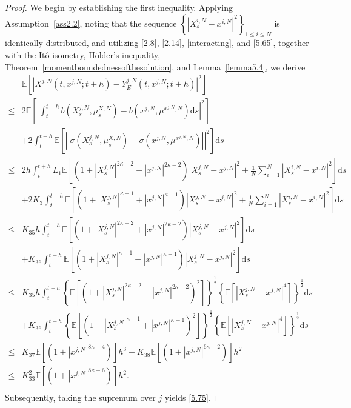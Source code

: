 \documentclass[12pt]{article}
\numberwithin{equation}{section}
\begin{document}
\begin{proof}  We begin by establishing the first inequality. Applying Assumption~\ref{ass2.2}, noting that the sequence $\left\{ \left|X_s^{i,N} - x^{i,N}\right|^2 \right\}_{1 \leq i \leq N}$ is identically distributed, and utilizing  \eqref{2.8}, \eqref{2.14}, \eqref{interacting}, and \eqref{5.65}, together with the It\^o isometry, H\"older's inequality, Theorem~\ref{momentboundednessofthesolution}, and Lemma~\ref{lemma5.4}, we derive 
\begin{equation}\tag{5.105}\label{5.78}
\begin{aligned}
& \mathbb{E}\left[\left|X^{j,N}\left(t, x^{j,N} ; t+h\right)-Y^{j,N}_E\left(t, x^{j,N} ; t+h\right)\right|^{2}\right] \\
\leq & 2\mathbb{E}\left[\left|\int_t^{t+h} b\left({X}^{j,N}_s,\mu^{X,N}_s\right)-b\left( x^{j,N},\mu ^{x^{j,N},N} \right) \mathrm{d} s\right|^{2}\right]\\
&+2\int_t^{t+h} \mathbb{E}\left[\left|\left|\sigma\left({X}^{j,N}_s,\mu^{X,N}_s\right)-\sigma\left( x^{j,N},\mu ^{x^{j,N},N} \right) \right|\right|^{2}\right]\mathrm{d}s \\
\leq & 2 h\int_t^{t+h} L_1 \mathbb{E}\left[\left(1+\left|X^{j,N}_s\right|^{2 \kappa-2}+\left|x^{j,N}\right|^{2 \kappa-2}\right)\left|X^{j,N}_s-x^{j,N}\right|^{2}+\tfrac{1}{N}\sum_{i=1}^N{\left|X_{s}^{i,N}-x^{i,N}\right|^2}\right] \mathrm{d} s \\
& +2K_{3}\int_t^{t+h} \mathbb{E}\left[\left(1+\left|X^{j,N}_s\right|^{\kappa-1}+\left|x^{j,N}\right|^{\kappa-1}\right)\left|X^{j,N}_s-x^{j,N}\right|^{2}+\tfrac{1}{N}\sum_{i=1}^N{\left|X_{s}^{i,N}-x^{i,N}\right|^2}\right] \mathrm{d} s \\
\leq & K_{35} h\int_t^{t+h}\mathbb{E}\left[\left(1+\left|X^{j,N}_s\right|^{2 \kappa-2}+\left|x^{j,N}\right|^{2 \kappa-2}\right)\left|X^{j,N}_s-x^{j,N}\right|^{2}\right] \mathrm{d} s \\
&+K_{36}\int_t^{t+h} \mathbb{E}\left[\left(1+\left|X^{j,N}_s\right|^{\kappa-1}+\left|x^{j,N}\right|^{\kappa-1}\right)\left|X^{j,N}_s-x^{j,N}\right|^{2}\right] \mathrm{d} s \\
\leq & K_{35} h
\int_t^{t+h} \left\{\mathbb{E}\left[\left(1+\left|X^{j,N}_s\right|^{2 \kappa-2}+\left|x^{j,N}\right|^{2 \kappa-2}\right)^{2}\right]\right\}^{\frac{1}{2 }}\left\{\mathbb{E}\left[\left|X^{j,N}_s-x^{j,N}\right|^{4}\right]\right\}^{\frac{1}{2}}\mathrm{d} s\\
&+K_{36}\int_t^{t+h}\left\{\mathbb{E}\left[\left(1+\left|X^{j,N}_s\right|^{\kappa-1}+\left|x^{j,N}\right|^{\kappa-1}\right)^{2}\right]\right\}^{\frac{1}{2}}\left\{\mathbb{E}\left[\left|X^{j,N}_s-x^{j,N}\right|^{4}\right]\right\}^{\frac{1}{2}}\mathrm{d} s\\
\leq & K_{37}\mathbb{E}\left[\left(1+\left|x^{j,N}\right|^{8 \kappa-4}\right)\right] h^{3}+K_{38}\mathbb{E}\left[\left(1+\left|x^{j,N}\right|^{6 \kappa -2}\right)\right]h^2 \\
\leq &K^{2}_{33}\mathbb{E}\left[\left(1+\left|x^{j,N}\right|^{8 \kappa+6}\right)\right] h^2.\\
\end{aligned}
\end{equation}
Subsequently, taking the supremum over $ j $ yields \eqref{5.75}.


\end{proof}
\end{document}
